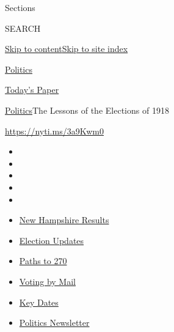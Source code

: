 Sections

SEARCH

\protect\hyperlink{site-content}{Skip to
content}\protect\hyperlink{site-index}{Skip to site index}

\href{https://www.nytimes3xbfgragh.onion/section/politics}{Politics}

\href{https://myaccount.nytimes3xbfgragh.onion/auth/login?response_type=cookie\&client_id=vi}{}

\href{https://www.nytimes3xbfgragh.onion/section/todayspaper}{Today's
Paper}

\href{/section/politics}{Politics}\textbar{}The Lessons of the Elections
of 1918

\url{https://nyti.ms/3a9Kwm0}

\begin{itemize}
\item
\item
\item
\item
\item
\end{itemize}

\begin{itemize}
\item
  \href{https://www.nytimes3xbfgragh.onion/interactive/2020/09/08/us/elections/results-new-hampshire-primary-elections.html?action=click\&pgtype=Article\&state=default\&region=TOP_BANNER\&context=storylines_menu}{New
  Hampshire Results}
\item
  \href{https://www.nytimes3xbfgragh.onion/live/2020/09/08/us/trump-vs-biden?action=click\&pgtype=Article\&state=default\&region=TOP_BANNER\&context=storylines_menu}{Election
  Updates}
\item
  \href{https://www.nytimes3xbfgragh.onion/interactive/2020/us/elections/election-states-biden-trump.html?action=click\&pgtype=Article\&state=default\&region=TOP_BANNER\&context=storylines_menu}{Paths
  to 270}
\item
  \href{https://www.nytimes3xbfgragh.onion/interactive/2020/08/31/us/politics/vote-by-mail-deadlines.html?action=click\&pgtype=Article\&state=default\&region=TOP_BANNER\&context=storylines_menu}{Voting
  by Mail}
\item
  \href{https://www.nytimes3xbfgragh.onion/interactive/2019/us/elections/2020-presidential-election-calendar.html?action=click\&pgtype=Article\&state=default\&region=TOP_BANNER\&context=storylines_menu}{Key
  Dates}
\item
  \href{https://www.nytimes3xbfgragh.onion/newsletters/politics?action=click\&pgtype=Article\&state=default\&region=TOP_BANNER\&context=storylines_menu}{Politics
  Newsletter}
\end{itemize}

